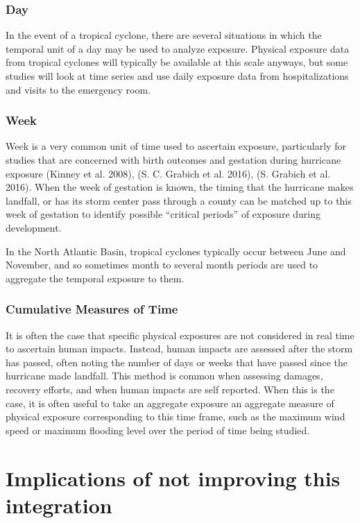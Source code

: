 \documentclass[]{article}
\begin{document}
\subsubsection{Day}\label{day}

In the event of a tropical cyclone, there are several situations in
which the temporal unit of a day may be used to analyze exposure.
Physical exposure data from tropical cyclones will typically be
available at this scale anyways, but some studies will look at time
series and use daily exposure data from hospitalizations and visits to
the emergency room.

\subsubsection{Week}\label{week}

Week is a very common unit of time used to ascertain exposure,
particularly for studies that are concerned with birth outcomes and
gestation during hurricane exposure (Kinney et al. 2008), (S. C. Grabich
et al. 2016), (S. Grabich et al. 2016). When the week of gestation is
known, the timing that the hurricane makes landfall, or has its storm
center pass through a county can be matched up to this week of gestation
to identify possible ``critical periods'' of exposure during
development.

In the North Atlantic Basin, tropical cyclones typically occur between
June and November, and so sometimes month to several month periods are
used to aggregate the temporal exposure to them.

\subsubsection{Cumulative Measures of
Time}\label{cumulative-measures-of-time}

It is often the case that specific physical exposures are not considered
in real time to ascertain human impacts. Instead, human impacts are
assessed after the storm has passed, often noting the number of days or
weeks that have passed since the hurricane made landfall. This method is
common when assessing damages, recovery efforts, and when human impacts
are self reported. When this is the case, it is often useful to take an
aggregate exposure an aggregate measure of physical exposure
corresponding to this time frame, such as the maximum wind speed or
maximum flooding level over the period of time being studied.

\section{Implications of not improving this
integration}\label{implications-of-not-improving-this-integration}
\end{document}
